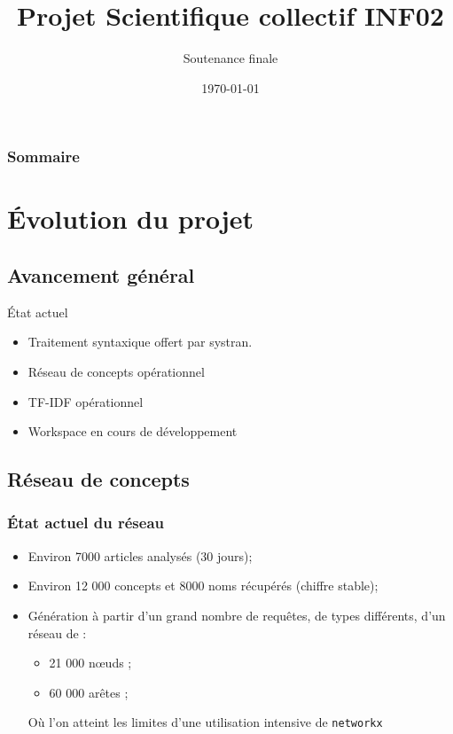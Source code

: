 \documentclass[12pt]{beamer}
\title{Projet Scientifique collectif INF02}
\subtitle{Soutenance finale}
\author{}
\date{\today}
\begin{document}
    \begin{frame}
      \titlepage
    \end{frame}		

    \begin{frame}
      \frametitle{Sommaire}
      \tableofcontents
    \end{frame}

\section{Évolution du projet}
\subsection{Avancement général}

\begin{frame}
  \begin{block}{État actuel}
    \begin{itemize}
      \item Traitement syntaxique offert par systran.
      \item Réseau de concepts opérationnel
      \item TF-IDF opérationnel
      \item Workspace en cours de développement
    \end{itemize}
  \end{block}
\end{frame}

\subsection{Réseau de concepts}
\begin{frame}
\frametitle{État actuel du réseau}

\begin{itemize}
 \item Environ 7000 articles analysés (30 jours);
 \item Environ 12 000 concepts et 8000 noms récupérés (chiffre stable);
 \item Génération à partir d'un grand nombre de requêtes, de types différents, d'un réseau de :
 \begin{itemize}
  \item 21 000 n\oe uds ;
  \item 60 000 arêtes ;
 \end{itemize}
 \pause
 Où l'on atteint les limites d'une utilisation intensive de \texttt{networkx}
 
\end{itemize}

\end{frame}
\end{document}
